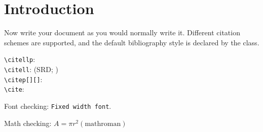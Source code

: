\documentclass[DM,lsstdraft,toc]{lsstdoc}
\title[Short title]{\theDocTitle}
\author{%
A.~Author,
B.~Author,
and
C.~Author}
\date{\today}
\begin{document}
\maketitle

\section{Introduction}

Now write your document as you would normally write it.
Different citation schemes are supported, and the default bibliography style is declared by the class.

\verb|\citellp|:  \\
\verb|\citell|: (SRD; ) \\
\verb|\citep[][]|: \citep[e.g.,][are interesting]{LPM-17,LSE-29} \\
\verb|\cite|: \cite{LPM-17,LSE-29}

Font checking: \texttt{Fixed width font}.

Math checking: $A = \pi r^2 \mathrm{(math roman)}$


\end{document}
